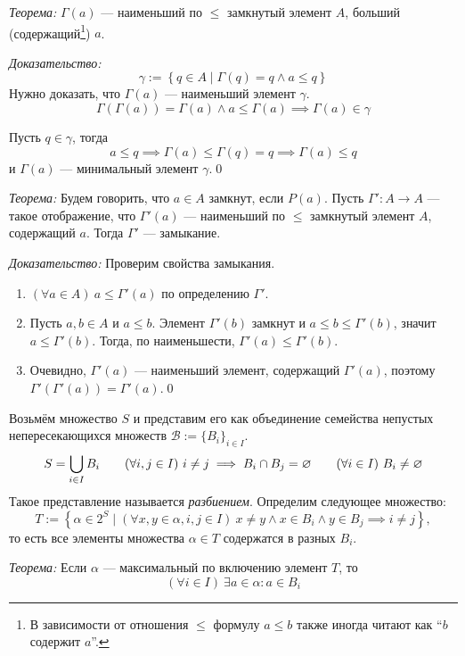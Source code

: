 \vspace{1em}
{\it Теорема:} $\Gamma(a)$ --- наименьший по $\leq$ замкнутый элемент $A$,
больший (содержащий\footnote{В зависимости от отношения $\leq$ формулу
$a\leq b$ также иногда читают как ``$b$ содержит $a$''.}) $a$.

{\it Доказательство:}
\[
	\gamma:=\left\{q\in A\;\big|\; \Gamma(q)=q\land a\leq q\right\}
\]
Нужно доказать, что $\Gamma(a)$ --- наименьший элемент $\gamma$.
\[
	\Gamma(\Gamma(a))=\Gamma(a)\land a\leq\Gamma(a)\implies\Gamma(a)\in\gamma
\]

Пусть $q\in \gamma$, тогда
\[
	a\leq q\implies \Gamma(a)\leq\Gamma(q)=q\implies\Gamma(a)\leq q
\]
и $\Gamma(a)$ --- минимальный элемент $\gamma$.\qed

\vspace{1em}
{\it Теорема:}
Будем говорить, что $a\in A$ замкнут, если $P(a)$.
Пусть ${\Gamma':A\to A}$ --- такое отображение, что $\Gamma'(a)$ --- наименьший по
$\leq$ замкнутый элемент $A$, содержащий $a$. Тогда $\Gamma'$ --- замыкание.

{\it Доказательство:}
Проверим свойства замыкания.
\begin{enumerate}
	\item{}$(\forall a\in A)~a\leq \Gamma'(a)$ по определению $\Gamma'$.
	\item{}Пусть $a,b\in A$ и $a\leq b$. Элемент $\Gamma'(b)$ замкнут и
		$a\leq b\leq\Gamma'(b)$, значит $a\leq\Gamma'(b)$. Тогда, по наименьшести,
		$\Gamma'(a)\leq\Gamma'(b)$.
	\item{}Очевидно, $\Gamma'(a)$ --- наименьший элемент,
		содержащий $\Gamma'(a)$, поэтому $\Gamma'(\Gamma'(a))=\Gamma'(a)$.\qed
\end{enumerate}

\newcommand\B{\mathcal B}
Возьмём множество $S$ и представим его как объединение семейства непустых
непересекающихся множеств $\B:=\{B_{i}\}_{i\in I}$.
\[
	S=\bigcup_{i\in I}B_{i}\qquad
	(\forall i,j\in I)~i\neq j\implies B_{i}\cap B_{j}=\varnothing\qquad
	(\forall i\in I)~B_{i}\neq\varnothing
\]
Такое представление называется {\it разбиением}.
Определим следующее множество:
\[
	T:=\left\{\alpha\in 2^{S}\;\big|\; (\forall x,y\in\alpha,i,j\in I)~
	x\neq y\land	x\in B_{i}\land y\in B_{j}\implies i\neq j\right\},
\]
то есть все элементы множества $\alpha\in T$ содержатся в разных $B_{i}$.

\vspace{1em}
{\it Теорема:} Если $\alpha$ --- максимальный по включению элемент $T$, то
\[
	(\forall i\in I)~\exists a\in\alpha:a\in B_{i}
\]

